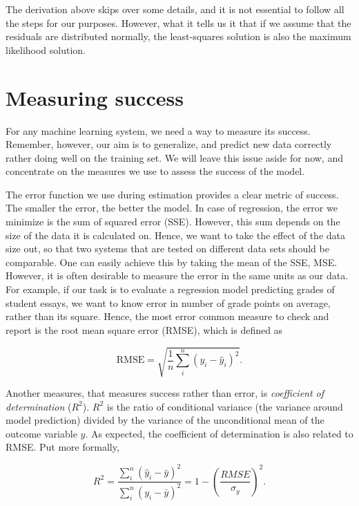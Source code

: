 The derivation above skips over some details,
and it is not essential to follow all the steps for our purposes.
However, what it tells us it that if we assume
that the residuals are distributed normally,
the least-squares solution is also the maximum likelihood solution.

\section{Measuring success}

For any machine learning system,
we need a way to measure its success.
Remember, however, our aim is to generalize,
and predict new data correctly rather doing well on the training set.
We will leave this issue aside for now,
and concentrate on the measures we use to assess the success of the model.

The error function we use during estimation
provides a clear metric of success.
The smaller the error, the better the model.
In case of regression, the error we minimize is
the sum of squared error (SSE).
However, this sum depends on the size of the data it is calculated on.
Hence, we want to take the effect of the data size out,
so that two systems that are tested on different data sets should be comparable.
One can easily achieve this by taking the mean of the SSE, MSE.
However, it is often desirable to measure the error
in the same units as our data.
For example,
if our task is to evaluate a regression model
predicting grades of student essays,
we want to know error in number of grade points on average,
rather than its square.
Hence, the most error common measure to check and report is
the root mean square error (RMSE),
which is defined as

\begin{equation*}
    \text{RMSE} = \sqrt{\frac{1}{n} \sum_{i}^{n} (y_{i} - \hat{y}_{i})^{2}} .
\end{equation*}


Another measures, that measures success rather than error,
is \emph{coefficient of determination} ($R^{2}$).
$R^{2}$ is the ratio of conditional variance
(the variance around model prediction) divided
by the variance of the unconditional mean of the outcome variable $y$.
As expected, the coefficient of determination is also related to RMSE.
Put more formally,

\begin{equation}\label{eq:r-squared}
  R^{2} = \frac{\sum_{i}^{n}(\hat{y}_{i} - \bar{y})^{2}}%
           {\sum_{i}^{n}(y_{i} - \bar{y})^{2}}
       = 1 - \left(\frac{RMSE}{\sigma_{y}}\right)^{2} .
\end{equation}

